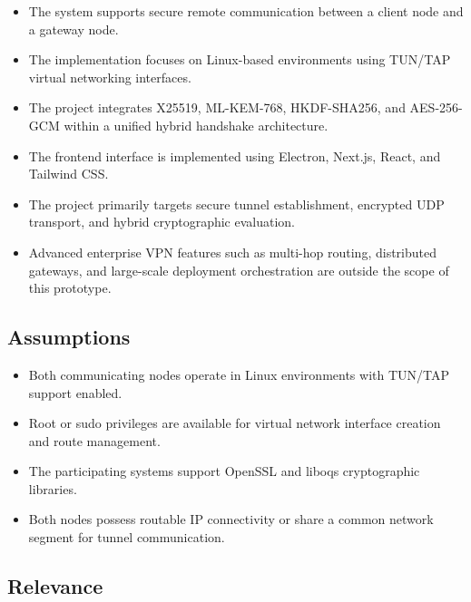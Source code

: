 \begin{itemize}

    \item The system supports secure remote communication between a client node and a gateway node.

    \item The implementation focuses on Linux-based environments using TUN/TAP virtual networking interfaces.

    \item The project integrates X25519, ML-KEM-768, HKDF-SHA256, and AES-256-GCM within a unified hybrid handshake architecture.

    \item The frontend interface is implemented using Electron, Next.js, React, and Tailwind CSS.

    \item The project primarily targets secure tunnel establishment, encrypted UDP transport, and hybrid cryptographic evaluation.

    \item Advanced enterprise VPN features such as multi-hop routing, distributed gateways, and large-scale deployment orchestration are outside the scope of this prototype.

\end{itemize}

\subsection*{Assumptions}

\begin{itemize}

    \item Both communicating nodes operate in Linux environments with TUN/TAP support enabled.

    \item Root or sudo privileges are available for virtual network interface creation and route management.

    \item The participating systems support OpenSSL and liboqs cryptographic libraries.

    \item Both nodes possess routable IP connectivity or share a common network segment for tunnel communication.

\end{itemize}

\subsection*{Relevance}

